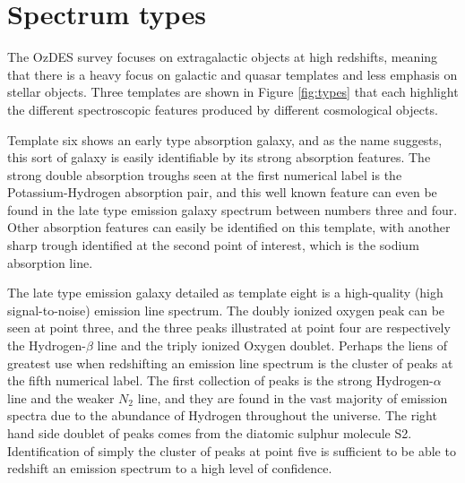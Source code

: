 \documentclass[titlesmallcaps, examinerscopy, copyrightpage]{uqthesis}
\begin{document}
\section{Spectrum types}

The OzDES survey focuses on extragalactic objects at high redshifts, meaning that there is a heavy focus on galactic and quasar templates and less emphasis on stellar objects. Three templates are shown in Figure \ref{fig:types} that each highlight the different spectroscopic features produced by different cosmological objects.

Template six shows an early type absorption galaxy, and as the name suggests, this sort of galaxy is easily identifiable by its strong absorption features. The strong double absorption troughs seen at the first numerical label is the Potassium-Hydrogen absorption pair, and this well known feature can even be found in the late type emission galaxy spectrum between numbers three and four. Other absorption features can easily be identified on this template, with another sharp trough identified at the second point of interest, which is the sodium absorption line.

The late type emission galaxy detailed as template eight is a high-quality (high signal-to-noise) emission line spectrum. The doubly ionized oxygen peak can be seen at point three, and the three peaks illustrated at point four are respectively the Hydrogen-$\beta$ line and the triply ionized Oxygen doublet. Perhaps the liens of greatest use when redshifting an emission line spectrum is the cluster of peaks at the fifth numerical label. The first collection of peaks is the strong Hydrogen-$\alpha$ line and the weaker $N_2$ line, and they are found in the vast majority of emission spectra due to the abundance of Hydrogen throughout the universe. The right hand side doublet of peaks comes from the diatomic sulphur molecule S2. Identification of simply the cluster of peaks at point five is sufficient to be able to redshift an emission spectrum to a high level of confidence.
\end{document}
